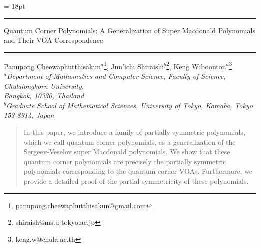 \documentclass[12pt,reqno,a4paper]{amsart}
\newcommand{\HRule}[1]{\rule{\linewidth}{#1}} 	%
\numberwithin{equation}{section}
\theoremstyle{definition}
\begin{document}
	
	\baselineskip = 18pt 
	
	\begin{titlepage}
		
		\bigskip
		\hfill\vbox{\baselineskip12pt
			\hbox{}
		}
		\bigskip
		\begin{center}
			\Large{ \scshape
				\HRule{3pt}
				Quantum Corner Polynomials: A Generalization of Super Macdonald Polynomials and Their 
				VOA Correspondence
				\HRule{3pt}
			}
		\end{center}
		\bigskip
		\bigskip
		
		
		
		\begin{center}
			\large 
			Panupong Cheewaphutthisakun$^{a}$\footnote{panupong.cheewaphutthisakun@gmail.com},
			Jun'ichi Shiraishi$^{b}$\footnote{shiraish@ms.u-tokyo.ac.jp},
			Keng Wiboonton$^{a}$\footnote{keng.w@chula.ac.th}
			\\
			\bigskip
			\bigskip
			$^a${\small {\it Department of Mathematics and Computer Science, Faculty of Science, Chulalongkorn University, 
					\\
					Bangkok, 10330, Thailand}}\\
			$^b${\small {\it Graduate School of Mathematical Sciences, University of Tokyo, Komaba, Tokyo 153-8914, Japan}} \\
		\end{center}
		\bigskip
		\bigskip
		
		{\vskip 6cm}
		{\small
			\begin{quote}
				In this paper, we introduce a family of partially symmetric polynomials, which we call quantum corner polynomials, as a generalization of the Sergeev-Veselov super Macdonald polynomials. We show that these quantum corner polynomials are precisely the partially symmetric polynomials corresponding to the quantum corner VOAs. Furthermore, we provide a detailed proof of the partial symmetricity of these polynomials. 
		\end{quote}}
		
		
	\end{titlepage}
	
	
\end{document}

